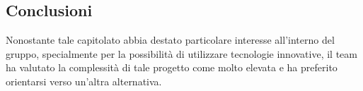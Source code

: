 \subsection{Conclusioni}
Nonostante tale capitolato abbia destato particolare interesse all'interno del gruppo, specialmente per la possibilità di utilizzare tecnologie innovative, il team ha valutato la complessità di tale progetto come molto elevata e ha preferito orientarsi verso un'altra alternativa.
